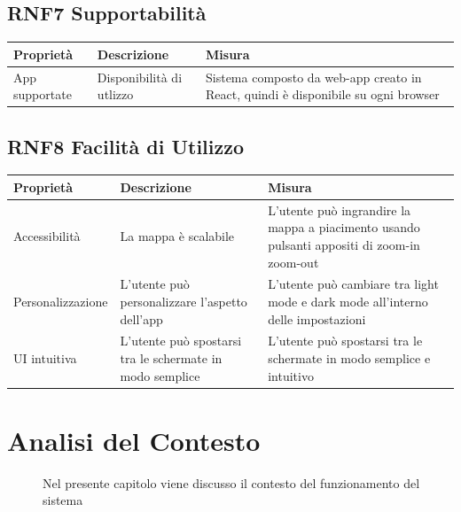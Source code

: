 \documentclass{article}
\let\origthesubsection\thesubsection
\begin{document}
\subsection{RNF7 Supportabilità}
\begin{center}
    \begin{longtable}{|p{4cm}|p{8cm}|p{4cm}|}
        \hline
        Proprietà      & Descrizione              & Misura                                                                            \\
        \hline
        App supportate & Disponibilità di utlizzo & Sistema composto da web-app creato in React, quindi è disponibile su ogni browser \\
        \hline
    \end{longtable}
\end{center}
\subsection{RNF8 Facilità di Utilizzo}
\begin{center}
    \begin{longtable}{|p{4cm}|p{8cm}|p{4cm}|}
        \hline
        Proprietà         & Descrizione                                              & Misura                                                                                     \\
        \hline
        Accessibilità     & La mappa è scalabile                                     & L'utente può ingrandire la mappa a piacimento usando pulsanti appositi di zoom-in zoom-out \\
        \hline
        Personalizzazione & L'utente può personalizzare l'aspetto dell'app           & L'utente può cambiare tra light mode e dark mode all'interno delle impostazioni            \\
        \hline
        UI intuitiva      & L'utente può spostarsi tra le schermate in modo semplice & L'utente può spostarsi tra le schermate in modo semplice e intuitivo                       \\
        \hline
    \end{longtable}
\end{center}
\renewcommand\thesubsection{\origthesubsection}
\clearpage
\section{Analisi del Contesto}
\begin{description}
    \item[] Nel presente capitolo viene discusso il contesto del funzionamento del sistema
\end{description}
\end{document}
